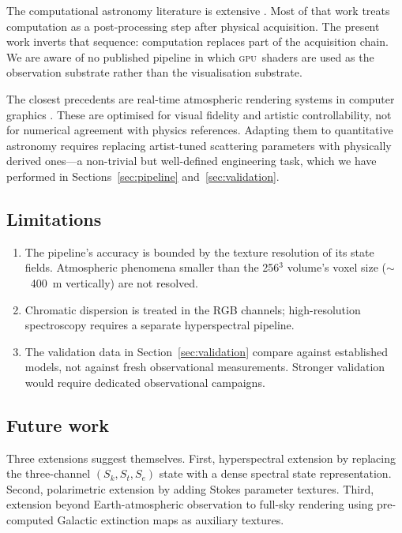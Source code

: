 \documentclass[11pt,twocolumn,a4paper]{article}
\theoremstyle{definition}
\theoremstyle{remark}
\newcommand{\gpu}{\textsc{gpu}}
\begin{document}
The computational astronomy literature is extensive \citep{astropy2013,keller2016,racine2002}. Most of that work treats computation as a post-processing step after physical acquisition. The present work inverts that sequence: computation replaces part of the acquisition chain. We are aware of no published pipeline in which \gpu\ shaders are used as the observation substrate rather than the visualisation substrate.

The closest precedents are real-time atmospheric rendering systems in computer graphics \citep{hillaire2020,bruneton2008,nishita1993}. These are optimised for visual fidelity and artistic controllability, not for numerical agreement with physics references. Adapting them to quantitative astronomy requires replacing artist-tuned scattering parameters with physically derived ones---a non-trivial but well-defined engineering task, which we have performed in Sections~\ref{sec:pipeline} and~\ref{sec:validation}.

\subsection{Limitations}

\begin{enumerate}[nosep]
\item The pipeline's accuracy is bounded by the texture resolution of its state fields. Atmospheric phenomena smaller than the 256$^3$ volume's voxel size ($\sim$~400~m vertically) are not resolved.
\item Chromatic dispersion is treated in the RGB channels; high-resolution spectroscopy requires a separate hyperspectral pipeline.
\item The validation data in Section~\ref{sec:validation} compare against established models, not against fresh observational measurements. Stronger validation would require dedicated observational campaigns.
\end{enumerate}

\subsection{Future work}

Three extensions suggest themselves. First, hyperspectral extension by replacing the three-channel $(S_k, S_t, S_e)$ state with a dense spectral state representation. Second, polarimetric extension by adding Stokes parameter textures. Third, extension beyond Earth-atmospheric observation to full-sky rendering using pre-computed Galactic extinction maps as auxiliary textures.
\end{document}
